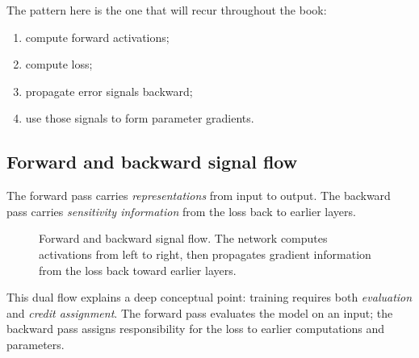 The pattern here is the one that will recur throughout the book:

\begin{enumerate}
    \item compute forward activations;
    \item compute loss;
    \item propagate error signals backward;
    \item use those signals to form parameter gradients.
\end{enumerate}

\subsection*{Forward and backward signal flow}

The forward pass carries \emph{representations} from input to output. The backward pass carries \emph{sensitivity information} from the loss back to earlier layers.

\begin{figure}[tbp]
\centering
{}
\caption{Forward and backward signal flow. The network computes activations from left to right, then propagates gradient information from the loss back toward earlier layers.}
\end{figure}

This dual flow explains a deep conceptual point: training requires both \emph{evaluation} and \emph{credit assignment}. The forward pass evaluates the model on an input; the backward pass assigns responsibility for the loss to earlier computations and parameters.

